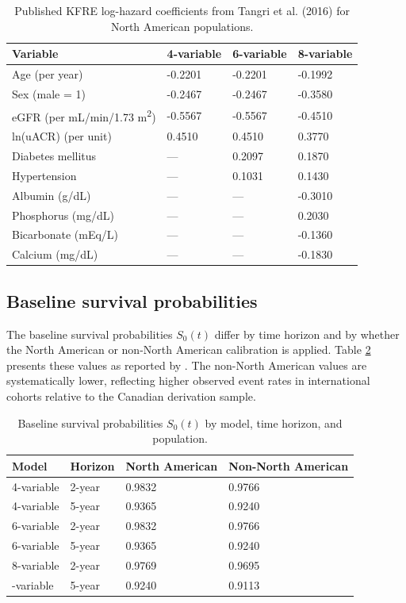 \begin{table}

\caption{\label{tab:coef-table}Published KFRE log-hazard coefficients from Tangri et al. (2016) for North American populations.}
\centering
\begin{tabular}[t]{llll}
\toprule
Variable & 4-variable & 6-variable & 8-variable\\
\midrule
Age (per year) & -0.2201 & -0.2201 & -0.1992\\
Sex (male = 1) & -0.2467 & -0.2467 & -0.3580\\
eGFR (per mL/min/1.73 m\textsuperscript{2}) & -0.5567 & -0.5567 & -0.4510\\
ln(uACR) (per unit) & 0.4510 & 0.4510 & 0.3770\\
Diabetes mellitus & --- & 0.2097 & 0.1870\\
\addlinespace
Hypertension & --- & 0.1031 & 0.1430\\
Albumin (g/dL) & --- & --- & -0.3010\\
Phosphorus (mg/dL) & --- & --- & 0.2030\\
Bicarbonate (mEq/L) & --- & --- & -0.1360\\
Calcium (mg/dL) & --- & --- & -0.1830\\
\bottomrule
\end{tabular}
\end{table}

\subsection{Baseline survival probabilities}\label{baseline-survival-probabilities}

The baseline survival probabilities \(S_0(t)\) differ by time horizon and
by whether the North American or non-North American calibration is applied.
Table \ref{tab:s0-table} presents these values as reported by \citet{tangri2016}.
The non-North American values are systematically lower, reflecting higher
observed event rates in international cohorts relative to the Canadian
derivation sample.

\begin{table}

\caption{\label{tab:s0-table}Baseline survival probabilities $S_0(t)$ by model, time horizon, and population.}
\centering
\begin{tabular}[t]{llll}
\toprule
Model & Horizon & North American & Non-North American\\
\midrule
4-variable & 2-year & 0.9832 & 0.9766\\
4-variable & 5-year & 0.9365 & 0.9240\\
6-variable & 2-year & 0.9832 & 0.9766\\
6-variable & 5-year & 0.9365 & 0.9240\\
8-variable & 2-year & 0.9769 & 0.9695\\
\addlinespace
8-variable & 5-year & 0.9240 & 0.9113\\
\bottomrule
\end{tabular}
\end{table}

